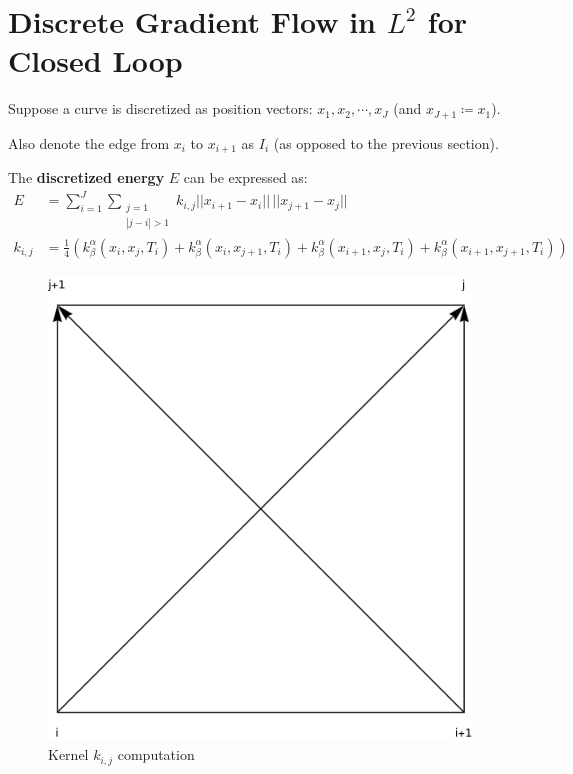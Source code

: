 \documentclass[a4paper, 11pt]{article}
\newcommand{\norm}[1]{||#1||}
\theoremstyle{definition}
\theoremstyle{remark}
\begin{document}
\section{Discrete Gradient Flow in $L^2$ for Closed Loop}
Suppose a curve is discretized as position vectors:
$x_1, x_2, \cdots, x_J$ (and $x_{J+1} \coloneqq x_1$).

Also denote the edge from $x_i$ to $x_{i+1}$ as $I_i$ (as opposed to the previous section).

The \textbf{discretized energy} $E$ can be expressed as:
\begin{align}
    E &= \sum_{i = 1}^{J} \sum_{\substack{j = 1 \\ |j-i| > 1}} k_{i,j} \norm{x_{i+1} - x_i} \, \norm{x_{j+1} - x_j} 
    \label{equ: Discretized Energy}
    \\
    k_{i,j} &= \frac{1}{4} \left( 
        k_{\beta}^{\alpha} \left( x_i, x_j, T_i \right)
        + k_{\beta}^{\alpha} \left( x_i, x_{j+1}, T_i \right)
        + k_{\beta}^{\alpha} \left( x_{i+1}, x_j, T_i \right)
        + k_{\beta}^{\alpha} \left( x_{i+1}, x_{j+1}, T_i \right)
    \right)
\end{align}

\begin{figure}[h]
    \centering
    \includegraphics[scale=0.6]{kernel-2x2.png}
    \caption{Kernel $k_{i,j}$ computation}
\end{figure}
\end{document}

